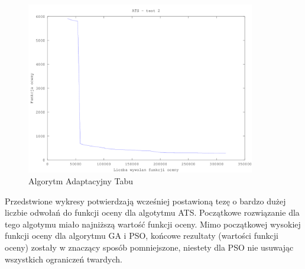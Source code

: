\begin{figure}[H]
  \caption{Algorytm Adaptacyjny Tabu}
  \centering
    \includegraphics[width=10cm]{ats_test_2.png}
\end{figure}
Przedstwione wykresy potwierdzają wcześniej postawioną tezę o bardzo dużej liczbie odwołań do funkcji oceny dla algotytmu ATS. Początkowe rozwiązanie dla tego algotymu miało najniższą wartość funkcji oceny. Mimo początkowej wysokiej funkcji oceny dla algorytmu GA i PSO, końcowe rezultaty (wartości funkcji oceny) zostały w znaczący sposób pomniejszone, niestety dla PSO nie usuwając wszystkich ograniczeń twardych.
